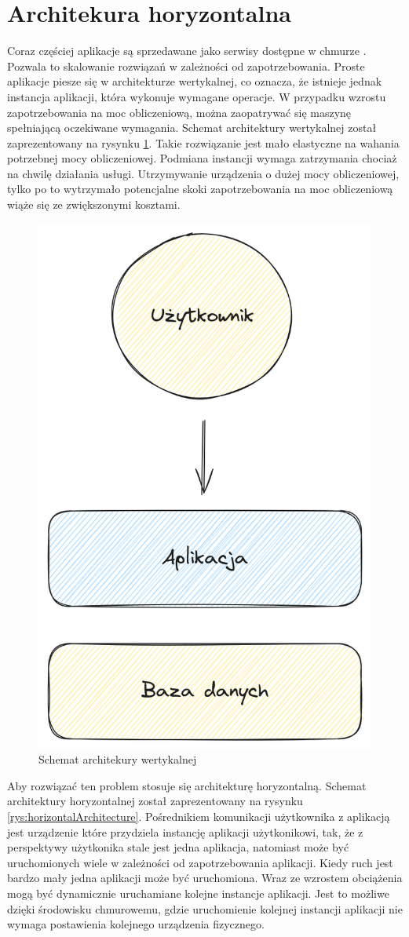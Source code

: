 \section{Architekura horyzontalna}

Coraz częściej aplikacje są sprzedawane jako serwisy dostępne w chmurze \cite{horizontalArchitecture}.
Pozwala to skalowanie rozwiązań w zależności od zapotrzebowania.
Proste aplikacje piesze się w architekturze wertykalnej, co oznacza, że istnieje jednak instancja aplikacji, która wykonuje wymagane operacje.
W przypadku wzrostu zapotrzebowania na moc obliczeniową, można zaopatrywać się maszynę spełniającą oczekiwane wymagania.
Schemat architektury wertykalnej został zaprezentowany na rysynku \ref{rys:veriticalArchitecture}.
Takie rozwiązanie jest mało elastyczne na wahania potrzebnej mocy obliczeniowej.
Podmiana instancji wymaga zatrzymania chociaż na chwilę działania usługi.
Utrzymywanie urządzenia o dużej mocy obliczeniowej, tylko po to wytrzymało potencjalne skoki zapotrzebowania na moc obliczeniową wiąże się ze zwiększonymi kosztami.

\begin{figure}[!hb]
	\centering \includegraphics[width=0.5\linewidth]{rysunki/vertical_archtecture.png}
	\caption{Schemat architekury wertykalnej}
	\label{rys:veriticalArchitecture}
\end{figure}


Aby rozwiązać ten problem stosuje się architekturę horyzontalną.
Schemat architektury horyzontalnej został zaprezentowany na rysynku \ref{rys:horizontalArchitecture}.
Pośrednikiem komunikacji użytkownika z aplikacją jest urządzenie które przydziela instancję aplikacji użytkonikowi, tak, że z perspektywy użytkonika stale jest jedna aplikacja, natomiast może być uruchomionych wiele w zależności od zapotrzebowania aplikacji.
Kiedy ruch jest bardzo mały jedna aplikacji może być uruchomiona.
Wraz ze wzrostem obciążenia mogą być dynamicznie uruchamiane kolejne instancje aplikacji.
Jest to możliwe dzięki środowisku chmurowemu, gdzie uruchomienie kolejnej instancji aplikacji nie wymaga postawienia kolejnego urządzenia fizycznego.

